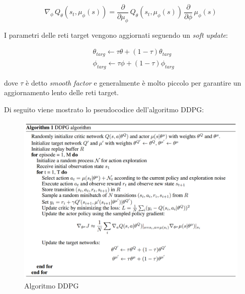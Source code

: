 \begin{equation}\label{gradactorddpg}
   \nabla_{\phi} \, Q_{\theta}(s_t,\mu_{\phi}(s)) =
   \frac{\partial}{\partial \mu_{\phi}} \, Q_{\theta}(s_t,\mu_{\phi}(s)) \,
   \frac{\partial}{\partial\phi} \, \mu_{\phi}(s)
\end{equation}


I parametri delle reti target vengono aggiornati seguendo un \textit{soft update}:

\begin{equation}\label{ddpgsoftupdate_eq}
   \begin{aligned}
       &\theta_{targ} \xleftarrow{} \tau \theta + (1-\tau) \theta_{targ} \\
       &\phi_{targ} \xleftarrow{} \tau \phi + (1-\tau) \phi_{targ}
   \end{aligned}
\end{equation}

dove $\tau$ è detto \textit{smooth factor} e generalmente è molto piccolo per garantire un aggiornamento lento delle reti target.

\clearpage

Di seguito viene mostrato lo pseudocodice dell'algoritmo DDPG\cite{ddpgPaper}:

\begin{figure}[hb]
    \centering
    \includegraphics[width = 6in]{Figures/Chapter2/ddpg_algo.png}
    \caption{Algoritmo DDPG}
    \label{fig:ddpgalgo}
\end{figure}

\clearpage